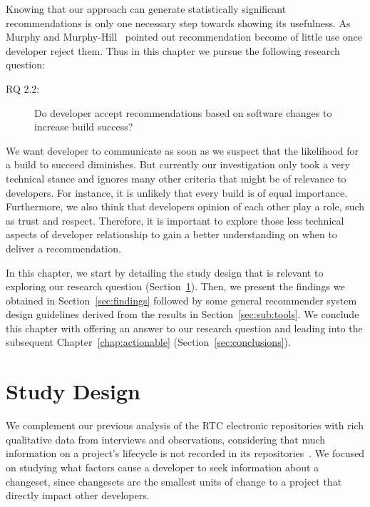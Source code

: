 \label{chap:talk}
Knowing that our approach can generate statistically significant recommendations is only one necessary step towards showing its usefulness.
As Murphy and Murphy-Hill~\cite{murphy:rsse:2010} pointed out recommendation become of little use once developer reject them.
Thus in this chapter we pursue the following research question:

\begin{description}
  \item[RQ 2.2:] Do developer accept recommendations based on software changes to increase build success? 
\end{description}

We want developer to communicate as soon as we suspect that the likelihood for a build to succeed diminishes.
But currently our investigation only took a very technical stance and ignores many other criteria that might be of relevance to developers.
For instance, it is unlikely that every build is of equal importance.
Furthermore, we also think that developers opinion of each other play a role, such as trust and respect.
Therefore, it is important to explore those less technical aspects of developer relationship to gain a better understanding on when to deliver a recommendation.

In this chapter, we start by detailing the study design that is relevant to exploring our research question (Section~\ref{sec:studydesign}).
Then, we present the findings we obtained in Section~\ref{sec:findings} followed by some general recommender system design guidelines derived from the results in Section~\ref{sec:sub:tools}.
We conclude this chapter with offering an answer to our research question and leading into the subsequent Chapter~\ref{chap:actionable} (Section~\ref{sec:conclusions}).


\section{Study Design}
\label{sec:studydesign}
We complement our previous analysis of the RTC electronic repositories with rich qualitative data from interviews and observations, considering that much information on a project's lifecycle is not recorded in its repositories~\cite{aranda:icse:2009}. We focused on studying what factors cause a developer to seek information about a changeset, since changesets are the smallest units of change to a project that directly impact other developers.

